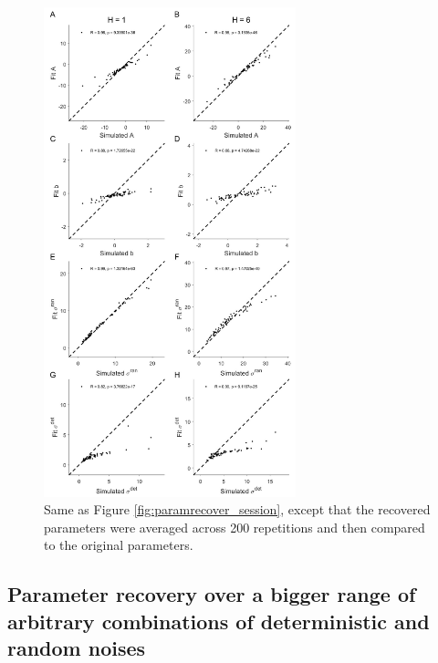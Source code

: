\documentclass[12pt]{article}
\begin{document}
	\begin{figure}[hp]
		\begin{center}
			\includegraphics[width=0.65\textwidth]{figures/RDBayes_parameterrecovery_subject.jpg}
			\caption{Same as Figure \ref{fig:paramrecover_session}, except that the recovered parameters were averaged across 200 repetitions and then compared to the original parameters.}
			\label{fig:paramrecover_sub}
		\end{center}
	\end{figure} 
	
	
	\newpage	
	\subsection{Parameter recovery over a bigger range of arbitrary combinations of deterministic and random noises \label{gridrecovery}}
	
	
\end{document}

